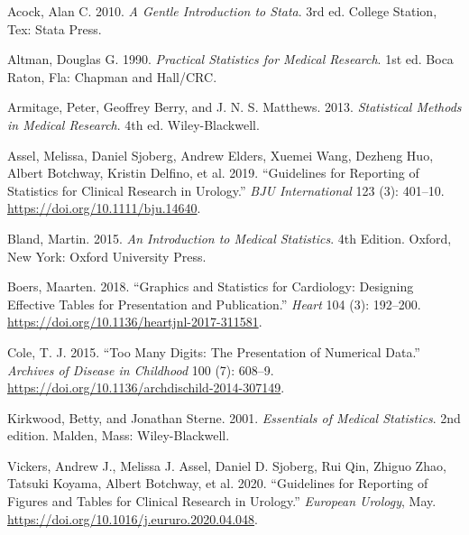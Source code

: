 \documentclass[
  a4paper,
]{memoir}
\newlength{\cslhangindent}
\newlength{\cslentryspacingunit} %
\newenvironment{CSLReferences}[2] %
 {%
  \setlength{\parindent}{0pt}
  \ifodd #1
  \let\oldpar\par
  \def\par{\hangindent=\cslhangindent\oldpar}
  \fi
  \setlength{\parskip}{#2\cslentryspacingunit}
 }%
 {}
\begin{document}
\hypertarget{refs}{}
\begin{CSLReferences}{1}{0}
\leavevmode{}%
Acock, Alan C. 2010. \emph{A {Gentle Introduction} to {Stata}}. 3rd ed.
College Station, Tex: Stata Press.

\leavevmode{}%
Altman, Douglas G. 1990. \emph{Practical {Statistics} for {Medical
Research}}. 1st ed. Boca Raton, Fla: {Chapman and Hall/CRC}.

\leavevmode{}%
Armitage, Peter, Geoffrey Berry, and J. N. S. Matthews. 2013.
\emph{Statistical {Methods} in {Medical Research}}. 4th ed.
Wiley-Blackwell.

\leavevmode{}%
Assel, Melissa, Daniel Sjoberg, Andrew Elders, Xuemei Wang, Dezheng Huo,
Albert Botchway, Kristin Delfino, et al. 2019. {``Guidelines for
Reporting of Statistics for Clinical Research in Urology.''} \emph{BJU
International} 123 (3): 401--10.
\url{https://doi.org/10.1111/bju.14640}.

\leavevmode{}%
Bland, Martin. 2015. \emph{An {Introduction} to {Medical Statistics}}.
4th Edition. Oxford, New York: Oxford University Press.

\leavevmode{}%
Boers, Maarten. 2018. {``Graphics and Statistics for Cardiology:
Designing Effective Tables for Presentation and Publication.''}
\emph{Heart} 104 (3): 192--200.
\url{https://doi.org/10.1136/heartjnl-2017-311581}.

\leavevmode{}%
Cole, T. J. 2015. {``Too Many Digits: The Presentation of Numerical
Data.''} \emph{Archives of Disease in Childhood} 100 (7): 608--9.
\url{https://doi.org/10.1136/archdischild-2014-307149}.

\leavevmode{}%
Kirkwood, Betty, and Jonathan Sterne. 2001. \emph{Essentials of {Medical
Statistics}}. 2nd edition. Malden, Mass: Wiley-Blackwell.

\leavevmode{}%
Vickers, Andrew J., Melissa J. Assel, Daniel D. Sjoberg, Rui Qin, Zhiguo
Zhao, Tatsuki Koyama, Albert Botchway, et al. 2020. {``Guidelines for
{Reporting} of {Figures} and {Tables} for {Clinical Research} in
{Urology}.''} \emph{European Urology}, May.
\url{https://doi.org/10.1016/j.eururo.2020.04.048}.

\end{CSLReferences}


\backmatter
\end{document}
